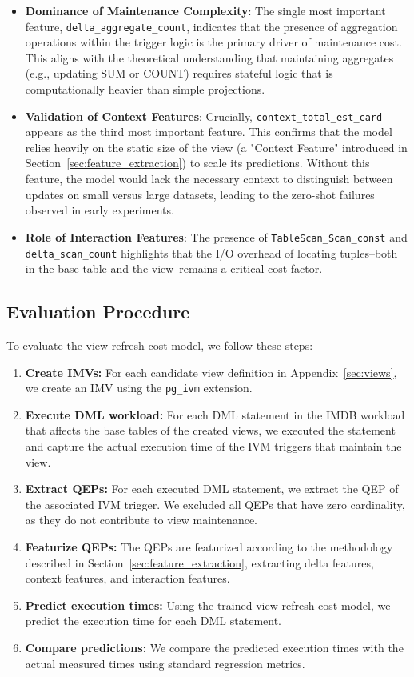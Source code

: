\begin{itemize}
    \item \textbf{Dominance of Maintenance Complexity}: The single most important feature, \texttt{delta\_aggregate\_count}, indicates that the presence of aggregation operations within the trigger logic is the primary driver of maintenance cost. This aligns with the theoretical understanding that maintaining aggregates (e.g., updating SUM or COUNT) requires stateful logic that is computationally heavier than simple projections.
    \item \textbf{Validation of Context Features}: Crucially, \texttt{context\_total\_est\_card} appears as the third most important feature. This confirms that the model relies heavily on the static size of the view (a "Context Feature" introduced in Section~\ref{sec:feature_extraction}) to scale its predictions. Without this feature, the model would lack the necessary context to distinguish between updates on small versus large datasets, leading to the zero-shot failures observed in early experiments.
    \item \textbf{Role of Interaction Features}: The presence of \texttt{TableScan\_Scan\_const} and \texttt{delta\_scan\_count} highlights that the I/O overhead of locating tuples--both in the base table and the view--remains a critical cost factor.
\end{itemize}

\subsection{Evaluation Procedure}
\label{sec:cost_model_procedure}

To evaluate the view refresh cost model, we follow these steps:
\begin{enumerate}
    \item \textbf{Create \acp{IMV}:} For each candidate view definition in Appendix~\ref{sec:views}, we create an \ac{IMV} using the \texttt{pg\_ivm} extension.
    \item \textbf{Execute \ac{DML} workload:} For each \ac{DML} statement in the IMDB workload that affects the base tables of the created views, we executed the statement and capture the actual execution time of the \ac{IVM} triggers that maintain the view.
    \item \textbf{Extract \ac{QEP}s:} For each executed \ac{DML} statement, we extract the \ac{QEP} of the associated \ac{IVM} trigger. We excluded all \ac{QEP}s that have zero cardinality, as they do not contribute to view maintenance.
    \item \textbf{Featurize \ac{QEP}s:} The \ac{QEP}s are featurized according to the methodology described in Section~\ref{sec:feature_extraction}, extracting delta features, context features, and interaction features.
    \item \textbf{Predict execution times:} Using the trained view refresh cost model, we predict the execution time for each \ac{DML} statement.
    \item \textbf{Compare predictions:} We compare the predicted execution times with the actual measured times using standard regression metrics.
\end{enumerate}

